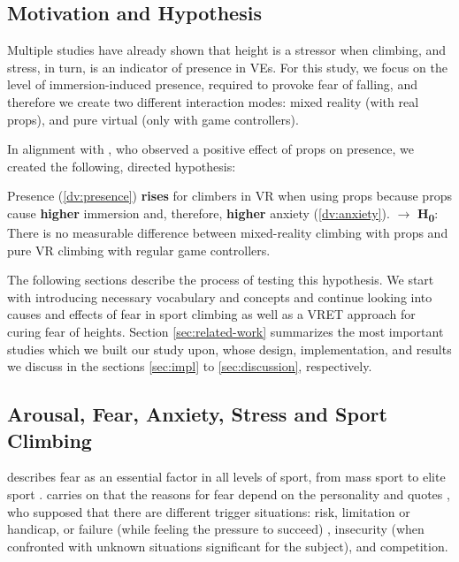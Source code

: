 \subsection{Motivation and Hypothesis}
\label{sec:hypothesis}

Multiple studies have already shown that height is a stressor when climbing, and stress, in turn, is an indicator of presence in \glspl{VE}. For this study, we focus on the level of immersion-induced presence, required to provoke fear of falling, and therefore we create two different interaction modes: mixed reality (with real props), and pure virtual (only with game controllers).

In alignment with \textcite{Meehan2001}, who observed a positive effect of props on presence, we created the following, directed hypothesis:

\begin{hyp*}	
	Presence (\ref{dv:presence}) \textbf{rises} for climbers in \gls{VR} when using props because props cause \textbf{higher} immersion and, therefore, \textbf{higher} anxiety (\ref{dv:anxiety}).
	$\rightarrow$ \textbf{H\textsubscript{0}}: There is no measurable difference between mixed-reality climbing with props and pure \gls{VR} climbing with regular game controllers. 
\end{hyp*}

The following sections describe the process of testing this hypothesis. We start with introducing necessary vocabulary and concepts and continue looking into causes and effects of fear in sport climbing as well as a \gls{VRET} approach for curing fear of heights. Section \ref{sec:related-work} summarizes the most important studies which we built our study upon, whose design, implementation, and results we discuss in the sections \ref{sec:impl} to \ref{sec:discussion}, respectively.
 
\subsection{Arousal, Fear, Anxiety, Stress and Sport Climbing}

\citeauthor{Breckner2013} describes fear as an essential factor in all levels of sport, from mass sport to elite sport \autocites[20]{Breckner2013}[based on][]{Hackfort1985}. \citeauthor{Breckner2013} carries on that the reasons for fear depend on the personality and quotes \textcite{Allmer1978}, who supposed that there are different trigger situations: risk, limitation or handicap, or failure (while feeling the pressure to succeed) \autocite[based on][]{Nitsch1976}, insecurity (when confronted with unknown situations significant for the subject), and competition.

